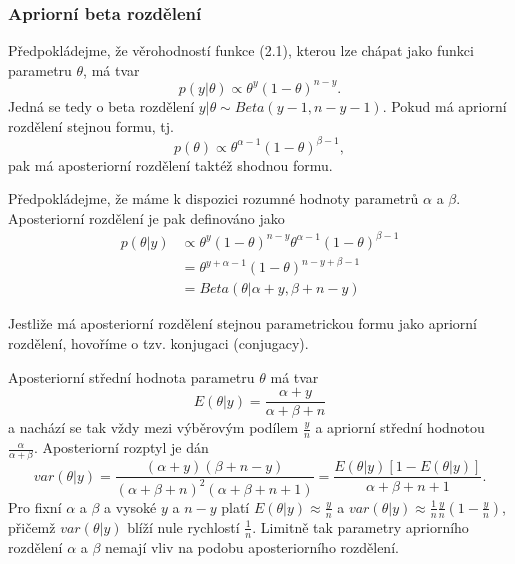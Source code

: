 \subsubsection{Apriorní beta rozdělení}

Předpokládejme, že věrohodností funkce (2.1), kterou lze chápat jako funkci parametru $\theta$, má tvar
\begin{equation}
p(y|\theta) \varpropto \theta^y (1 - \theta)^{n - y}.
\end{equation}
Jedná se tedy o beta rozdělení $y | \theta \sim \textit{Beta}(y - 1, n - y - 1)$. Pokud má apriorní rozdělení stejnou formu, tj.
\begin{equation}
p(\theta) \varpropto \theta^{\alpha - 1}(1 - \theta)^{\beta - 1},
\end{equation}
pak má aposteriorní rozdělení taktéž shodnou formu.

Předpokládejme, že máme k dispozici rozumné hodnoty parametrů $\alpha$ a $\beta$. Aposteriorní rozdělení je pak definováno jako
\begin{equation}
\begin{split}
p(\theta | y) & \varpropto \theta^y (1 - \theta)^{n - y} \theta^{\alpha - 1}(1 - \theta)^{\beta - 1}\\
 & = \theta^{y + \alpha - 1} (1 - \theta)^{n - y + \beta - 1}\\
 & = \textit{Beta}(\theta | \alpha + y, \beta + n - y)
\end{split}
\end{equation}

Jestliže má aposteriorní rozdělení stejnou parametrickou formu jako apriorní rozdělení, hovoříme o tzv. konjugaci (conjugacy).

Aposteriorní střední hodnota parametru $\theta$ má tvar
\begin{equation}
E(\theta | y) = \frac{\alpha + y}{\alpha + \beta + n}
\end{equation}
a nachází se tak vždy mezi výběrovým podílem $\frac{y}{n}$ a apriorní střední hodnotou $\frac{\alpha}{\alpha + \beta}$. Aposteriorní rozptyl je dán
\begin{equation}
var(\theta | y) = \frac{(\alpha + y)(\beta + n -y)}{(\alpha + \beta + n)^2(\alpha + \beta + n + 1)} = \frac{E(\theta|y)[1 - E(\theta | y)]}{\alpha + \beta + n + 1}.
\end{equation}
Pro fixní $\alpha$ a $\beta$ a vysoké $y$ a $n - y$ platí $E(\theta | y) \approx \frac{y}{n}$ a $var(\theta | y) \approx \frac{1}{n}\frac{y}{n}(1 - \frac{y}{n})$, přičemž $var(\theta | y)$ blíží nule rychlostí $\frac{1}{n}$. Limitně tak parametry apriorního rozdělení $\alpha$ a $\beta$ nemají vliv na podobu aposteriorního rozdělení.

